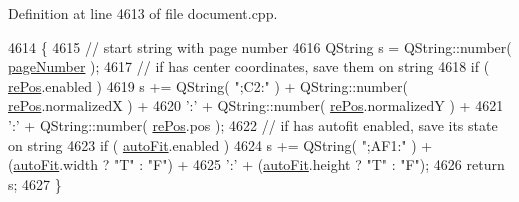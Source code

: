 Definition at line 4613 of file document.\+cpp.


\begin{DoxyCode}
4614 \{
4615     \textcolor{comment}{// start string with page number}
4616     QString s = QString::number( \hyperlink{classOkular_1_1DocumentViewport_a122674d4a493e79b1aa5fd5c00e81c93}{pageNumber} );
4617     \textcolor{comment}{// if has center coordinates, save them on string}
4618     \textcolor{keywordflow}{if} ( \hyperlink{classOkular_1_1DocumentViewport_a054f24bcba44b795a3671ac53693ff45}{rePos}.enabled )
4619         s += QString( \textcolor{stringliteral}{";C2:"} ) + QString::number( \hyperlink{classOkular_1_1DocumentViewport_a054f24bcba44b795a3671ac53693ff45}{rePos}.normalizedX ) +
4620              \textcolor{charliteral}{':'} + QString::number( \hyperlink{classOkular_1_1DocumentViewport_a054f24bcba44b795a3671ac53693ff45}{rePos}.normalizedY ) +
4621              \textcolor{charliteral}{':'} + QString::number( \hyperlink{classOkular_1_1DocumentViewport_a054f24bcba44b795a3671ac53693ff45}{rePos}.pos );
4622     \textcolor{comment}{// if has autofit enabled, save its state on string}
4623     \textcolor{keywordflow}{if} ( \hyperlink{classOkular_1_1DocumentViewport_a5acbe494c97c15ae7937003474a78a40}{autoFit}.enabled )
4624         s += QString( \textcolor{stringliteral}{";AF1:"} ) + (\hyperlink{classOkular_1_1DocumentViewport_a5acbe494c97c15ae7937003474a78a40}{autoFit}.width ? \textcolor{stringliteral}{"T"} : \textcolor{stringliteral}{"F"}) +
4625              \textcolor{charliteral}{':'} + (\hyperlink{classOkular_1_1DocumentViewport_a5acbe494c97c15ae7937003474a78a40}{autoFit}.height ? \textcolor{stringliteral}{"T"} : \textcolor{stringliteral}{"F"});
4626     \textcolor{keywordflow}{return} s;
4627 \}
\end{DoxyCode}


